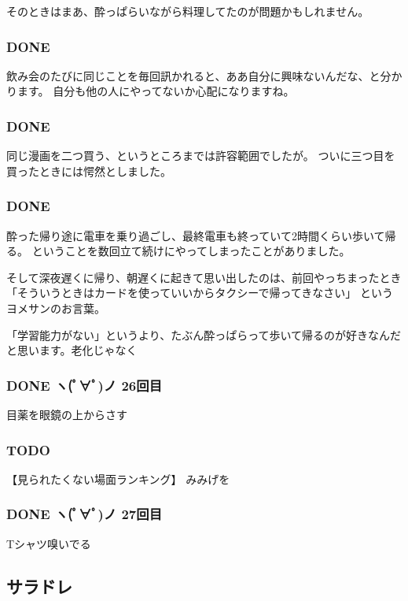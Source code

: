 \documentclass[11pt]{article}
\begin{document}
そのときはまあ、酔っぱらいながら料理してたのが問題かもしれません。
\subsubsection{\textbf{DONE}}
\label{sec-36_1_2}

飲み会のたびに同じことを毎回訊かれると、ああ自分に興味ないんだな、と分かります。
自分も他の人にやってないか心配になりますね。
\subsubsection{\textbf{DONE}}
\label{sec-36_1_3}

同じ漫画を二つ買う、というところまでは許容範囲でしたが。
ついに三つ目を買ったときには愕然としました。
\subsubsection{\textbf{DONE}}
\label{sec-36_1_4}

酔った帰り途に電車を乗り過ごし、最終電車も終っていて2時間くらい歩いて帰る。
ということを数回立て続けにやってしまったことがありました。

そして深夜遅くに帰り、朝遅くに起きて思い出したのは、前回やっちまったとき
「そういうときはカードを使っていいからタクシーで帰ってきなさい」
というヨメサンのお言葉。

「学習能力がない」というより、たぶん酔っぱらって歩いて帰るのが好きなんだと思います。老化じゃなく
\subsubsection{\textbf{DONE} ヽ(ﾟ∀ﾟ)ノ 26回目}
\label{sec-36_1_5}

目薬を眼鏡の上からさす
\subsubsection{\textbf{TODO}}
\label{sec-36_1_6}

【見られたくない場面ランキング】
みみげを
\subsubsection{\textbf{DONE} ヽ(ﾟ∀ﾟ)ノ 27回目}
\label{sec-36_1_7}

Tシャツ嗅いでる
\subsection{サラドレ}
\label{sec-36_2}
\end{document}
